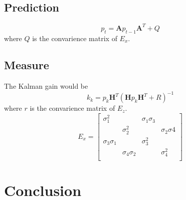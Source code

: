 \documentclass[12pt]{article}
\begin{document}
	\subsection{Prediction}\label{sub:predict}
	\begin{equation}
		p_t=\mathbf{A}p_{t-1}\mathbf{A}^T+Q
	\end{equation}
	where $Q$ is the convarience matrix of $E_x$.

	\subsection{Measure}\label{sub:measure}
	The Kalman gain would be
	\begin{equation}
		k_k=p_k\mathbf{H}^T{\left(\mathbf{H}p_k\mathbf{H}^T+R\right)}^{-1}
	\end{equation}
	where $r$ is the convarience matrix of $E_z$.
	\begin{equation}
		E_x=
		\begin{bmatrix}
			\sigma_1^2       &                  & \sigma_1\sigma_3 &                 \\
			                 & \sigma_2^2       &                  & \sigma_2\sigma4 \\
			\sigma_3\sigma_1 &                  & \sigma_3^2       &                 \\
			                 & \sigma_4\sigma_2 &                  & \sigma_4^2      \\
		\end{bmatrix}
	\end{equation}

	\section{Conclusion}
\end{document}
